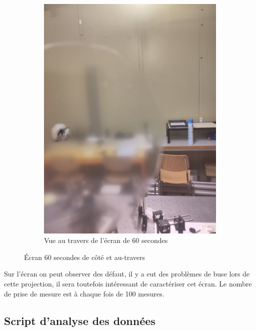 \begin{figure}[H]
\begin{subfigure}{.5\textwidth}
        \includegraphics[width=1\linewidth]{assets/figures/mesures/60_sec_travers.jpeg}
        \caption{Vue au travers de l'écran de 60 secondes}
    \end{subfigure}
    \caption{Écran 60 secondes de côté et au-travers}
\end{figure}
Sur l'écran on peut observer des défaut, il y a eut des problèmes de buse lors de cette projection, il sera toutefois
intéressant de caractériser cet écran. Le nombre de prise de mesure est à chaque fois de 100 mesures.

\subsection{Script d'analyse des données}